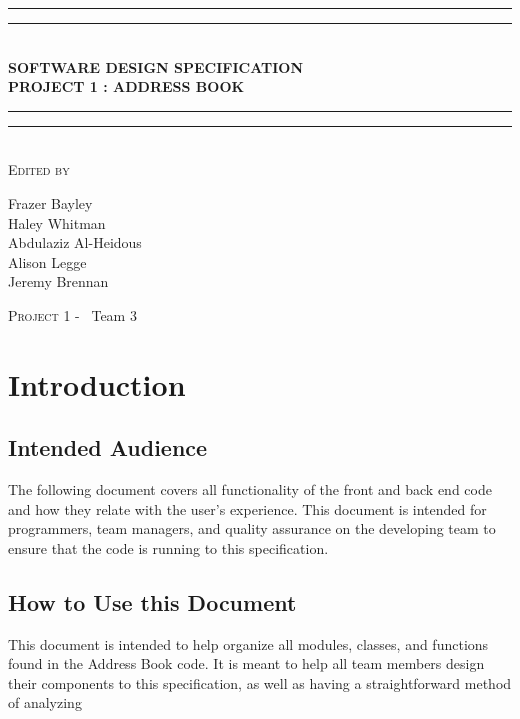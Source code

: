 \documentclass[a4paper, 11pt]{article}
\newlength{\drop}
\begin{document}
	
	\begin{titlepage}
		\textheight
		\centering
		\vspace*{\baselineskip}
		\rule{\textwidth}{1.6pt}\vspace*{-\baselineskip}\vspace*{2pt}
		\rule{\textwidth}{0.4pt}\\[\baselineskip]
		{\LARGE \textbf{SOFTWARE DESIGN SPECIFICATION \\ PROJECT 1 : ADDRESS BOOK}}\\[0.2\baselineskip]
		\rule{\textwidth}{0.4pt}\vspace*{-\baselineskip}\vspace{3.2pt}
		\rule{\textwidth}{1.6pt}\\[\baselineskip]
		\scshape
		\vspace*{2\baselineskip}
		Edited by \\[\baselineskip]
		{\Large Frazer Bayley \\ Haley Whitman \\ Abdulaziz Al-Heidous \\ Alison Legge \\ Jeremy Brennan\par}

		\vfill
		{\scshape \LARGE Project 1 -} \        {\LARGE Team 3}\par
	\end{titlepage}


\tableofcontents
\vspace*{10\baselineskip}
\begin{versionhistory}

	
\end{versionhistory}
\pagebreak

\section{Introduction}
\subsection{Intended Audience}
The following document covers all functionality of the front and back end code and how they relate with the user's experience. This document is intended for programmers, team managers, and quality assurance on the developing team to ensure that the code is running to this specification.
\subsection{How to Use this Document}
This document is intended to help organize all modules, classes, and functions found in the Address Book code. It is meant to help all team members design their components to this specification, as well as having a straightforward method of analyzing 
\end{document}
